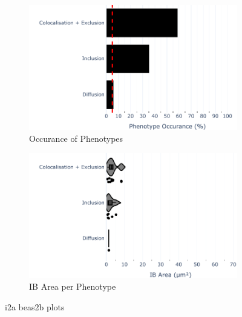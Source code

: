 \begin{figure}
    \begin{subfigure}{0.5\textwidth}
        \includegraphics[width=1\linewidth]{10. Chapter 5/Figs/01. Infection/01. IFIT2A/10. bar_i2a_beas2b.pdf} 
        \caption[]{Occurance of Phenotypes}
    \end{subfigure}
    \begin{subfigure}{0.5\textwidth}
        \includegraphics[width=1\linewidth]{10. Chapter 5/Figs/01. Infection/01. IFIT2A/11. violin_i2a_beas2b.pdf}
        \caption[]{IB Area per Phenotype}
    \end{subfigure}
    \caption[i2a beas2b plots]{i2a beas2b plots}
    \label{fig:i2a beas2b plots}
\end{figure}

